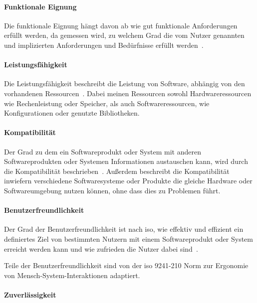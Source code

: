 \documentclass[12pt, a4paper, ngerman]{article}
\begin{document}
\paragraph{Funktionale Eignung}

Die funktionale Eignung hängt davon ab wie gut funktionale Anforderungen erfüllt werden,
da gemessen wird, zu welchem Grad die vom Nutzer genannten 
und implizierten Anforderungen und Bedürfnisse erfüllt werden~\cite{ISO25010}.

\paragraph{Leistungsfähigkeit}

Die Leistungsfähigkeit beschreibt die Leistung von Software, 
abhängig von den vorhandenen Ressourcen~\cite{ISO25010}.
Dabei meinen Ressourcen sowohl Hardwareressourcen wie Rechenleistung oder Speicher,
als auch Softwareressourcen, wie Konfigurationen oder genutzte Bibliotheken.

\paragraph{Kompatibilität}

Der Grad zu dem ein Softwareprodukt oder System mit anderen Softwareprodukten oder Systemen Informationen
austauschen kann, wird durch die Kompatibilität beschrieben~\cite{ISO25010}.
Außerdem beschreibt die Kompatibilität inwiefern verschiedene Softwaresysteme oder Produkte die gleiche Hardware
oder Softwareumgebung nutzen können, ohne dass dies zu Problemen führt.

\paragraph{Benutzerfreundlichkeit}

Der Grad der Benutzerfreundlichkeit ist nach \ac{iso},
wie effektiv und effizient ein definiertes Ziel von bestimmten Nutzern
mit einem Softwareprodukt oder System erreicht werden kann
und wie zufrieden die Nutzer dabei sind~\cite{ISO25010}.

Teile der Benutzerfreundlichkeit sind von der \ac{iso} 9241-210 Norm
zur Ergonomie von Mensch-System-Interaktionen adaptiert.

\paragraph{Zuverlässigkeit}
\end{document}
